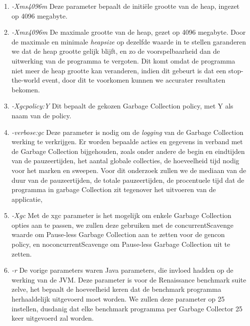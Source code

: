 \begin{enumerate}
    
    \item \textit{-Xms4096m}
    Deze parameter bepaalt de initiële grootte van de heap, ingezet op 4096 megabyte.
    
    
    \item \textit{-Xmx4096m}
    De maximale grootte van de heap, gezet op 4096 megabyte.
    Door de maximale en minimale \textit{heapsize} op dezelfde waarde in te stellen garanderen we dat de heap grootte gelijk blijft, en zo de voorspelbaarheid dan de uitwerking van de programma te vergoten.
    Dit komt omdat de programma niet meer de heap grootte kan veranderen, indien dit gebeurt is dat een stop-the-world event, door dit te voorkomen kunnen we accurater resultaten bekomen.
   

    \item \textit{-Xgcpolicy:Y}
    Dit bepaalt de gekozen Garbage Collection policy, met Y als naam van de policy.
    
    \item \textit{-verbose:gc}
    Deze parameter is nodig om de \textit{logging} van de Garbage Collection werking te verkrijgen.
    Er worden bepaalde acties en gegevens in verband met de Garbage Collection bijgehouden, zoals onder andere de begin en eindtijden van de pauzeertijden, het aantal globale collecties, de hoeveelheid tijd nodig voor het marken en sweepen.
    Voor dit onderzoek zullen we de mediaan van de duur van de pauzeertijden, de totale pauzeertijden, de procentuele tijd dat de programma in garbage Collection zit tegenover het uitvoeren van de applicatie,  %
    
    
    \item \textit{-Xgc}
    Met de xgc parameter is het mogelijk om enkele Garbage Collection opties aan te passen, we zullen deze gebruiken met de concurrentScavenge waarde om Pause-less Garbage Collection aan te zetten voor de gencon policy, en noconcurrentScavenge om Pause-less Garbage Collection uit te zetten.
    
    
    
    \item \textit{-r}
    De vorige parameters waren Java parameters, die invloed hadden op de werking van de JVM.
    Deze parameter is voor de Renaissance benchmark suite zelve, het bepaalt de hoeveelheid keren dat de benchmark programma herhaaldelijk uitgevoerd moet worden.
    We zullen deze parameter op 25 instellen, dusdanig dat elke benchmark programma per Garbage Collector 25 keer uitgevoerd zal worden.
    
\end{enumerate}

